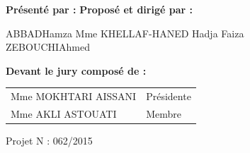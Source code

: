 \documentclass[a4paper,french,10pt,twoside]{report}
\begin{document}
\begin{sloppypar}
\begin{center}
\bigskip

\end{center}
\begin{flushleft}
\textbf{Présenté par :} \hspace{8,45cm} \textbf{Proposé et dirigé par :} 
 \end{flushleft}
\begin{flushleft}
ABBAD\hspace{0,2cm}Hamza \hspace{7cm} Mme KHELLAF-HANED Hadja Faiza\\
ZEBOUCHI\hspace{0,35cm}Ahmed
\end{flushleft}



\vspace{1cm}
\begin{center}
\textbf{Devant le jury composé de : }\\


\begin{table}[h]
\begin{center}
\begin{tabular}{p{}p{1cm}}
Mme MOKHTARI AISSANI & Présidente \\
Mme AKLI ASTOUATI & Membre \\
\end{tabular}
\end{center}
\end{table}

\end{center}

\vspace{3cm}

\begin{flushright}
Projet N : 062/2015
\end{flushright}




\end{sloppypar}
\end{document}
